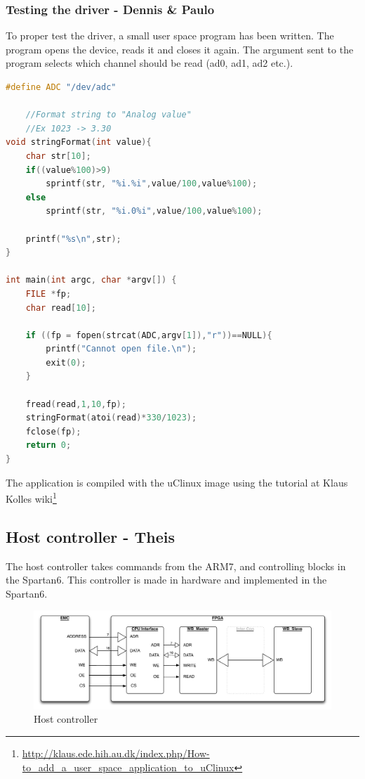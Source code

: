 \subsubsection{Testing the driver - Dennis \& Paulo}
To proper test the driver, a small user space program has been written. The program opens the device, reads it and closes it again.
The argument sent to the program selects which channel should be read (ad0, ad1, ad2 etc.).

\begin{lstlisting}[language=c]
#define ADC "/dev/adc"
	
	//Format string to "Analog value"
	//Ex 1023 -> 3.30
void stringFormat(int value){
	char str[10];
	if((value%100)>9)
		sprintf(str, "%i.%i",value/100,value%100);
 	else
 		sprintf(str, "%i.0%i",value/100,value%100);
 		
	printf("%s\n",str);
}

int main(int argc, char *argv[]) {
	FILE *fp;
	char read[10];

	if ((fp = fopen(strcat(ADC,argv[1]),"r"))==NULL){
		printf("Cannot open file.\n");
		exit(0);
	}
	
	fread(read,1,10,fp);
	stringFormat(atoi(read)*330/1023);
	fclose(fp);
	return 0;
}
\end{lstlisting}

The application is compiled with the uClinux image using the tutorial at Klaus Kolles wiki\footnote{\url{http://klaus.ede.hih.au.dk/index.php/How-to_add_a_user_space_application_to_uClinux}}

\subsection{Host controller - Theis}
The host controller takes commands from the ARM7, and controlling blocks in the Spartan6. This controller is made in hardware and implemented in the Spartan6.
\begin{figure}[H]
	\begin{centering}
		 \includegraphics[width=1.0\textwidth]{content/appendix/eudp/images/host_controller.pdf}
		\caption{Host controller}
	\end{centering}
\end{figure}
